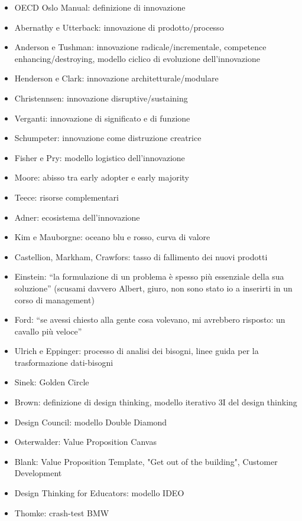 \documentclass[answers, a4paper, 11pt]{exam}
\begin{document}
\begin{itemize}
    \item OECD Oslo Manual: definizione di innovazione
    \item Abernathy e Utterback: innovazione di prodotto/processo
    \item Anderson e Tushman: innovazione radicale/incrementale, competence enhancing/destroying, modello ciclico di evoluzione dell'innovazione
    \item Henderson e Clark: innovazione architetturale/modulare
    \item Christennsen: innovazione disruptive/sustaining
    \item Verganti: innovazione di significato e di funzione
    \item Schumpeter: innovazione come distruzione creatrice
    \item Fisher e Pry: modello logistico dell'innovazione
    \item Moore: abisso tra early adopter e early majority
    \item Teece: risorse complementari
    \item Adner: ecosistema dell'innovazione
    \item Kim e Mauborgne: oceano blu e rosso, curva di valore
    \item Castellion, Markham, Crawfors: tasso di fallimento dei nuovi prodotti
    \item Einstein: ``la formulazione di un problema è spesso più essenziale della sua soluzione'' (scusami davvero Albert, giuro, non sono stato io a inserirti in un corso di management)
    \item Ford: ``se avessi chiesto alla gente cosa volevano, mi avrebbero risposto: un cavallo più veloce''
    \item Ulrich e Eppinger: processo di analisi dei bisogni, linee guida per la trasformazione dati-bisogni
    \item Sinek: Golden Circle
    \item Brown: definizione di design thinking, modello iterativo 3I del design thinking
    \item Design Council: modello Double Diamond
    \item Osterwalder: Value Proposition Canvas
    \item Blank: Value Proposition Template, "Get out of the building", Customer Development
    \item Design Thinking for Educators: modello IDEO
    \item Thomke: crash-test BMW

\end{itemize}
\end{document}
